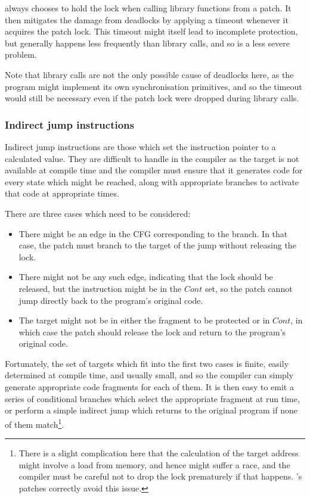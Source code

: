 {\Implementation} always chooses to hold the lock when calling library
functions from a patch.  It then mitigates the damage from deadlocks
by applying a timeout whenever it acquires the patch lock.  This
timeout might itself lead to incomplete protection, but generally
happens less frequently than library calls, and so is a less severe
problem.

Note that library calls are not the only possible cause of deadlocks
here, as the program might implement its own synchronisation
primitives\needCite{}, and so the timeout would still be necessary
even if the patch lock were dropped during library calls.

\subsubsection{Indirect jump instructions}

Indirect jump instructions are those which set the instruction pointer
to a calculated value.  They are difficult to handle in the compiler
as the target is not available at compile time and the compiler must
ensure that it generates code for every state which might be reached,
along with appropriate branches to activate that code at appropriate
times.

There are three cases which need to be considered:

\begin{itemize}
\item There might be an edge in the CFG corresponding to the branch.
  In that case, the patch must branch to the target of the jump
  without releasing the lock.
\item There might not be any such edge, indicating that the lock
  should be released, but the instruction might be in the
  $\mathit{Cont}$ set, so the patch cannot jump directly back to the
  program's original code.
\item The target might not be in either the fragment to be protected
  or in $\mathit{Cont}$, in which case the patch should release the
  lock and return to the program's original code.
\end{itemize}

Fortunately, the set of targets which fit into the first two cases is
finite, easily determined at compile time, and usually small, and so
the compiler can simply generate appropriate code fragments for each
of them.  It is then easy to emit a series of conditional branches
which select the appropriate fragment at run time, or perform a simple
indirect jump which returns to the original program if none of them
match\footnote{There is a slight complication here that the
  calculation of the target address might involve a load from memory,
  and hence might suffer a race, and the compiler must be careful not
  to drop the lock prematurely if that happens.  {\Implementation}'s
  patches correctly avoid this issue.}.

